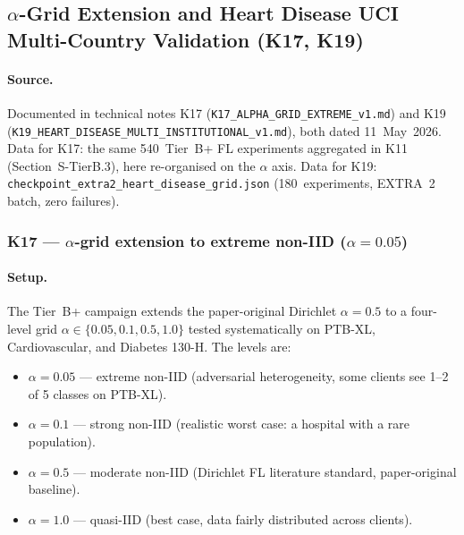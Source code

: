 \documentclass[conference]{IEEEtran}
\begin{document}
\subsection{$\alpha$-Grid Extension and Heart Disease UCI Multi-Country Validation (K17, K19)}
\label{sec:tier_b_alpha_hd}

\paragraph{Source.} Documented in technical notes K17 (\texttt{K17\_ALPHA\_GRID\_EXTREME\_v1.md}) and K19 (\texttt{K19\_HEART\_DISEASE\_MULTI\_INSTITUTIONAL\_v1.md}), both dated 11~May~2026. Data for K17: the same 540~Tier~B+ FL experiments aggregated in K11 (Section~S-TierB.3), here re-organised on the $\alpha$ axis. Data for K19: \texttt{checkpoint\_extra2\_heart\_disease\_grid.json} (180~experiments, EXTRA~2 batch, zero failures).

\subsubsection*{K17 --- $\alpha$-grid extension to extreme non-IID ($\alpha{=}0.05$)}

\paragraph{Setup.} The Tier~B+ campaign extends the paper-original Dirichlet $\alpha{=}0.5$ to a four-level grid $\alpha\in\{0.05, 0.1, 0.5, 1.0\}$ tested systematically on PTB-XL, Cardiovascular, and Diabetes 130-H. The levels are:

\begin{itemize}
\item $\alpha{=}0.05$ --- extreme non-IID (adversarial heterogeneity, some clients see 1--2 of 5 classes on PTB-XL).
\item $\alpha{=}0.1$ --- strong non-IID (realistic worst case: a hospital with a rare population).
\item $\alpha{=}0.5$ --- moderate non-IID (Dirichlet FL literature standard, paper-original baseline).
\item $\alpha{=}1.0$ --- quasi-IID (best case, data fairly distributed across clients).
\end{itemize}
\end{document}
